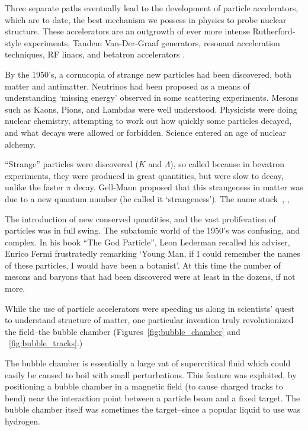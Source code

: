 Three separate paths eventually lead to the development of particle
accelerators, which are to date, the best mechanism we possess in physics to
probe nuclear structure. These accelerators are an outgrowth
of ever more intense Rutherford-style experiments, Tandem Van-Der-Graaf
generators, resonant acceleration techniques, RF linacs, and betatron
accelerators \cite{Bryant1994}.

By the 1950's, a cornucopia of strange new particles had been discovered, both
matter and antimatter. Neutrinos had been proposed as a means of understanding
`missing energy' observed in some scattering experiments. Mesons such as Kaons,
Pions, and Lambdas were well understood.  Physicists were doing nuclear
chemistry, attempting to work out how quickly some particles decayed, and what
decays were allowed or forbidden. Science entered an age of nuclear alchemy.

``Strange'' particles were discovered ($K$ and $\Lambda$), so called because in
bevatron experiments, they were produced in great quantities, but were slow to
decay, unlike the faster $\pi$ decay. Gell-Mann proposed that this strangeness
in matter was due to a new quantum number (he called it `strangeness'). The name
stuck~\cite{Gell-Mann1953}, \cite{Gell-Mann1956}, \cite{Krauss2015}

The introduction of new conserved quantities, and the vast proliferation of
particles was in full swing. The subatomic world of the 1950's was confusing,
and complex. In his book ``The God Particle'', Leon Lederman recalled his
adviser, Enrico Fermi frustratedly remarking `Young Man, if I could remember the
names of these particles, I would have been a botanist'. At this time the number
of mesons and baryons that had been discovered were at least in the dozens, if
not more.

While the use of particle accelerators were speeding us along in scientists'
quest to understand structure of matter, one particular invention truly
revolutionized the field--the bubble chamber (Figures~\ref{fig:bubble_chamber}
and ~\ref{fig:bubble_tracks}.)

The bubble chamber is essentially a large vat of supercritical fluid which could
easily be caused to boil with small perturbations. This feature was exploited,
by positioning a bubble chamber in a magnetic field (to cause charged tracks to
bend) near the interaction point between a particle beam and a fixed target. The
bubble chamber itself was sometimes the target--since a popular liquid to use
was hydrogen. 


